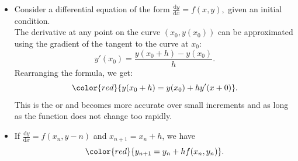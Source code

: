 \documentclass[12pt, a4paper]{article}
\def\d{{\mathrm{d}}}
\begin{document}
\begin{enumerate}
\begin{itemize}
        \item Consider a differential equation of the form $\frac{\d y}{\d x}=f(x,y),$ given an initial condition. \\
        The derivative at any point on the curve $(x_0, y(x_0))$ can be approximated using the gradient of the tangent to the curve at $x_0$: 
        $$y'(x_0)=\frac{y(x_0+h)-y(x_0)}{h}.$$
        Rearranging the formula, we get: 
        $${\color{red}{y(x_0+h)=y(x_0)+hy'(x+0)}}.$$
        This is the \textbf{\color{red}{linearization}} or \textbf{\color{red}{Euler's method}} and becomes more accurate over small increments and as long as the function does not change too rapidly. 
        \item If $\frac{\d y}{\d x}=f(x_n,y-n)$ and $x_{n+1}=x_n+h$, we have 
        $${\color{red}{y_{n+1}=y_n+hf(x_n,y_n)}}.$$
    \end{itemize}
\end{enumerate}
\end{document}
